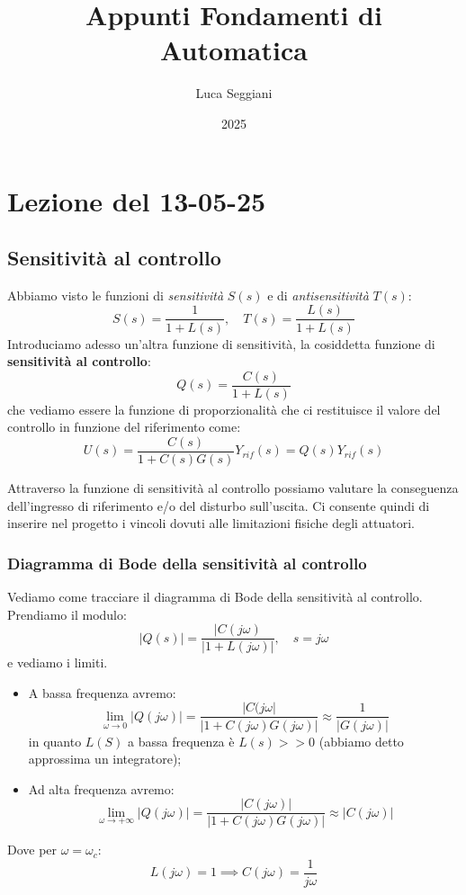 \documentclass[a4paper,11pt]{article}
\title{Appunti Fondamenti di Automatica}
\author{Luca Seggiani}
\date{2025}
\begin{document}
\section{Lezione del 13-05-25}

\thispagestyle{empty}
\pagestyle{fancy}

\subsection{Sensitività al controllo}
Abbiamo visto le funzioni di \textit{sensitività} $S(s)$ e di \textit{antisensitività} $T(s)$:
$$
S(s) = \frac{1}{1 + L(s)}, \quad T(s) = \frac{L(s)}{1 + L(s)}
$$
Introduciamo adesso un'altra funzione di sensitività, la cosiddetta funzione di \textbf{sensitività al controllo}:
$$
Q(s) = \frac{C(s)}{1 + L(s)}
$$
che vediamo essere la funzione di proporzionalità che ci restituisce il valore del controllo in funzione del riferimento come:
$$
U(s) = \frac{C(s)}{1 + C(s) G(s)} Y_{rif}(s) = Q(s) Y_{rif}(s)
$$

Attraverso la funzione di sensitività al controllo possiamo valutare la conseguenza dell'ingresso di riferimento e/o del disturbo sull'uscita.
Ci consente quindi di inserire nel progetto i vincoli dovuti alle limitazioni fisiche degli attuatori.

\subsubsection{Diagramma di Bode della sensitività al controllo}
Vediamo come tracciare il diagramma di Bode della sensitività al controllo.
Prendiamo il modulo:
$$
|Q(s)| = \frac{|C(j\omega)}{|1 + L(j\omega)|}, \quad s = j\omega
$$
e vediamo i limiti.

\begin{itemize}
	\item A bassa frequenza avremo: 
		$$
		\lim_{\omega \rightarrow 0} |Q(j\omega)| = \frac{|C(j\omega|}{|1 + C(j\omega) G(j\omega)|} \approx \frac{1}{|G(j\omega)|}
		$$
		in quanto $L(S)$ a bassa frequenza è $L(s) >> 0$ (abbiamo detto approssima un integratore);
	\item Ad alta frequenza avremo:
		$$
		\lim_{\omega \rightarrow +\infty} |Q(j\omega)| = \frac{|C(j\omega)|}{|1 + C(j\omega) G(j\omega)|} \approx |C(j\omega)|
		$$
\end{itemize}

Dove per $\omega = \omega_c$:
$$
L(j\omega) = 1 \implies C(j\omega) = \frac{1}{j\omega}
$$
\end{document}
